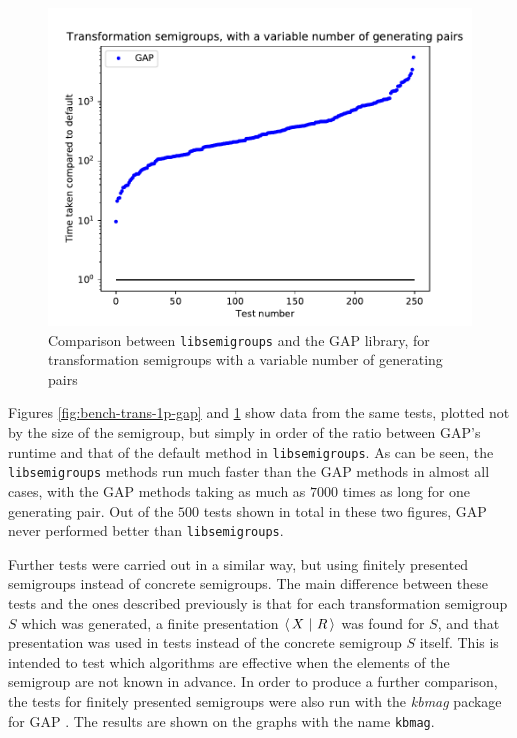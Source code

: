 \begin{figure}[h]
  \centering
  \includegraphics[width=\textwidth]{pics/ch-pairs/bench-trans-vp-gap}
  \caption[Benchmark: GAP/\texttt{libsemigroups}, concrete, $n$ pairs]
  {Comparison between \texttt{libsemigroups} and the GAP library, for
    transformation semigroups with a variable number of generating pairs}
  \label{fig:bench-trans-vp-gap}
\end{figure}

Figures \ref{fig:bench-trans-1p-gap} and \ref{fig:bench-trans-vp-gap} show data
from the same tests, plotted not by
the size of the semigroup, but simply in order of the ratio between GAP's
runtime and that of the default method in \texttt{libsemigroups}.  As can be
seen, the \texttt{libsemigroups} methods run much faster than the GAP methods in
almost all cases, with the GAP methods taking as much as $7000$ times as long
for one generating pair.  Out of the $500$ tests shown in total in these two
figures, GAP never performed better than \texttt{libsemigroups}.

Further tests were carried out in a similar way, but using finitely presented
semigroups instead of concrete semigroups.  The main difference between these
tests and the ones described previously is that for each transformation
semigroup $S$ which was generated, a finite presentation $\left\langle\,X ~\middle|~ R\,\right\rangle$ was found
for $S$, and that presentation was used in tests instead of the concrete
semigroup $S$ itself.  This is intended to test which algorithms are effective
when the elements of the semigroup are not known in advance.
In order to produce a further comparison, the tests for finitely presented
semigroups were also run with the \textit{kbmag} package for GAP \cite{kbmag}.
The results are shown on the graphs with the name \texttt{kbmag}.

